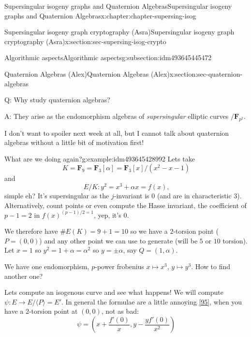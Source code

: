 \documentclass[oneside,10pt,]{book}
\numberwithin{equation}{section}
\newcommand{\FF}{\mathbf{F}}
\begin{document}
\begin{chapterptx}{Supersingular isogeny graphs and Quaternion Algebras}{}{Supersingular isogeny graphs and Quaternion Algebras}{}{}{x:chapter:chapter-supersing-isog}
\begin{sectionptx}{Supersingular isogeny graph cryptography (Asra)}{}{Supersingular isogeny graph cryptography (Asra)}{}{}{x:section:sec-supersing-isog-crypto}
\begin{subsectionptx}{Algorithmic aspects}{}{Algorithmic aspects}{}{}{g:subsection:idm493645445472}
\begin{enumerate}
\end{enumerate}
%
\end{subsectionptx}
\end{sectionptx}
%
%
\typeout{************************************************}
\typeout{************************************************}
%
\begin{sectionptx}{Quaternion Algebras (Alex)}{}{Quaternion Algebras (Alex)}{}{}{x:section:sec-quaternion-algebras}
\begin{introduction}{}%
Q: Why study quaternion algebras?%
\par
A: They arise as the endomorphism algebras of \emph{supersingular} elliptic curves \(/\FF_{p^2}\).%
\par
I don't want to spoiler next week at all, but I cannot talk about quaternion algebras without a little bit of motivation first!%
\begin{example}{What are we doing again?}{g:example:idm493645428992}%
Lets take%
\begin{equation*}
K = \FF_9 = \FF_3[\alpha] = \FF_3[x]/(x^2- x - 1)
\end{equation*}
and%
\begin{equation*}
E/K\colon y^2 = x^3 + \alpha x = f(x)\text{,}
\end{equation*}
simple eh? It's supersingular as the \(j\)-invariant is 0 (and are in characteristic 3). Alternatively, count points or even compute the Hasse invariant, the coefficient of \(p -1 = 2\) in \(f(x)^{(p-1)/2 = 1}\), yep, it's 0.%
\par
We therefore have \(\#E(K) = 9 + 1 = 10\) so we have a \(2\)-torsion point (\(P = (0,0)\)) and any other point we can use to generate (will be \(5\) or \(10\) torsion). Let \(x = 1\) so \(y^2 = 1 + \alpha = \alpha^2\) so \(y = \pm\alpha\), say \(Q = (1,\alpha)\).%
\par
We have one endomorphism, \(p\)-power frobenius \(x\mapsto x^3\), \(y\mapsto y^3\). How to find another one?%
\par
Lets compute an isogenous curve and see what happens! We will compute \(\psi\colon  E \to E/\langle P \rangle = E'\). In general the formulae are  a little annoying \hyperlink{x:biblio:bib-velu}{[95]}, when you have a 2-torsion point at \((0,0)\), not as bad:%
\begin{equation*}
\psi = \left(x + \frac{f'(0)}{x}, y - \frac{yf'(0)}{x^2} \right)
\end{equation*}
%
\begin{equation*}

\end{equation*}
\end{example}
\end{introduction}
\end{sectionptx}
\end{chapterptx}
\end{document}

